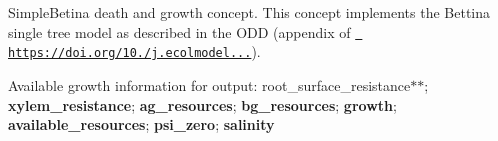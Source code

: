 Simple\+Betina death and growth concept. This concept implements the Bettina single tree model as described in the ODD (appendix of \href{https://doi.org/10.1016/j.ecolmodel.2018.10.005}{\texttt{ https\+://doi.\+org/10./j.\+ecolmodel...}}).

Available growth information for output\+: root\+\_\+surface\+\_\+resistance$\ast$$\ast$; {\bfseries{xylem\+\_\+resistance}}; {\bfseries{ag\+\_\+resources}}; {\bfseries{bg\+\_\+resources}}; {\bfseries{growth}}; {\bfseries{available\+\_\+resources}}; {\bfseries{psi\+\_\+zero}}; {\bfseries{salinity}} 